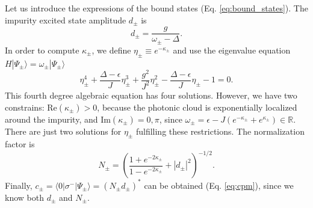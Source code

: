 \documentclass[aps,pra,twocolumn,floatfix,superscriptaddress]{revtex4-1}%
\begin{document}

Let us introduce the expressions of the bound states (Eq. \eqref{eq:bound_states}). The impurity excited state amplitude $d_\pm$ is
\begin{equation}
d_\pm = \frac{g}{\omega_\pm - \Delta}.\label{eq:d_bound_states}
\end{equation}
In order to compute $\kappa_\pm$, we define $\eta_\pm \equiv e^{-\kappa_\pm}$ and use the eigenvalue equation $H|\Psi_\pm\rangle = \omega_\pm|\Psi_\pm\rangle$ \cite{Longo2011}
\begin{equation}\label{eq:eta}
\eta_\pm ^4 + \frac{\Delta-\epsilon}{J} \eta_\pm ^3 + \frac{g^2}{J^2} \eta_\pm ^2 - \frac{\Delta-\epsilon}{J} \eta_\pm - 1 = 0.
\end{equation}
This fourth degree algebraic equation has four solutions. However, we have two constrains: $\text{Re}(\kappa_\pm)>0$, because the photonic cloud is exponentially localized around the impurity, and $\text{Im}(\kappa_\pm)=0,\pi$, since $\omega_\pm = \epsilon - J(e^{-\kappa_\pm} + e^{\kappa_\pm}) \in \mathbb{R}$. There are just two solutions for $\eta_\pm$ fulfilling these restrictions.
The normalization factor is
\begin{equation}\label{eq:Npm}
N_\pm = \left(\frac{1+e^{-2\kappa_\pm}}{1-e^{-2\kappa_\pm}}+|d_\pm|^2\right)^{-1/2}.
\end{equation}
Finally, $c_\pm=\langle 0|\sigma^-|\Psi_\pm\rangle=(N_\pm d_\pm)^*$ can be obtained (Eq. \eqref{eq:cpm}), since we know both $d_\pm$ and $N_\pm$.

\end{document}
